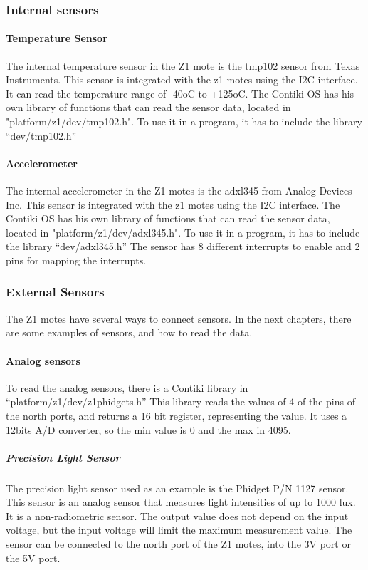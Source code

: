 \subsubsection{Internal sensors}

\paragraph{Temperature Sensor}

The internal temperature sensor in the Z1 mote is the tmp102 sensor from Texas Instruments.
This sensor is integrated with the z1 motes using the I2C interface.
It can read the temperature range of -40oC to +125oC.
The Contiki OS has his own library of functions that can read the sensor data,
	located in "platform/z1/dev/tmp102.h".
To use it in a program,
	it has to include the library “dev/tmp102.h” 

\paragraph{Accelerometer}
The internal accelerometer in the Z1 motes is the adxl345 from Analog Devices Inc.
This sensor is integrated with the z1 motes using the I2C interface.
The Contiki OS has his own library of functions that can read the sensor data,
	located in "platform/z1/dev/adxl345.h".
To use it in a program,
	it has to include the library “dev/adxl345.h” The sensor has 8 different interrupts to enable and 2 pins for mapping the interrupts.

\subsubsection{External Sensors}
The Z1 motes have several ways to connect sensors.
In the next chapters,
	there are some examples of sensors,
	and how to read the data.

\paragraph{Analog sensors}

To read the analog sensors,
	there is a Contiki library in “platform/z1/dev/z1phidgets.h” This library reads the values of 4 of the pins of the north ports,
	and returns a 16 bit register,
	representing the value.
It uses a 12bits A/D converter,
	so the min value is 0 and the max in 4095.


\subparagraph{Precision Light Sensor}
The precision light sensor used as an example is the Phidget P/N 1127 sensor.
This sensor is an analog sensor that measures light intensities of up to 1000 lux.
It is a non-radiometric sensor.
The output value does not depend on the input voltage,
	but the input voltage will limit the maximum measurement value.
The sensor can be connected to the north port of the Z1 motes,
	into the 3V port or the 5V port.

